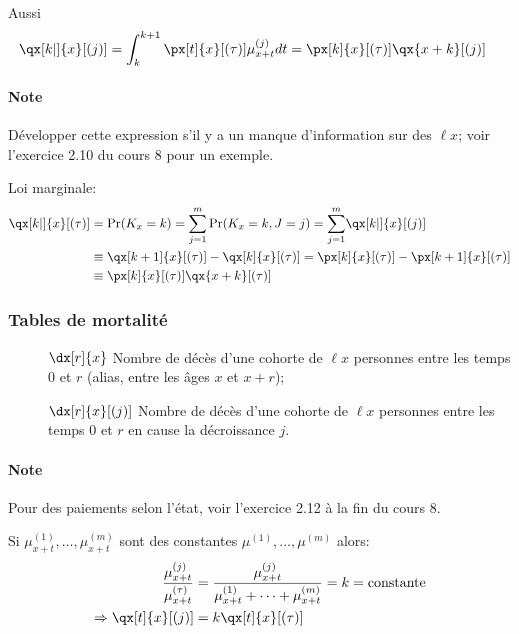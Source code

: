 \documentclass[10pt, french]{article}
\begin{document}
\begin{multicols*}{2}
Aussi
\begin{align*}
	\qx[k|]{x}[(j)]
	&=	\int_{k}^{k + 1} \px[t]{x}[(\tau)] \mu_{x + t}^{(j)}dt
	=	\px[k]{x}[(\tau)] \qx{x + k}[(j)]
\end{align*}
\paragraph{Note}	Développer cette expression s'il y a un manque d'information sur des $\ell{x}$; voir l'exercice 2.10 du cours 8 pour un exemple.

Loi marginale:
\begin{align*}
	\qx[k|]{x}[(\tau)]
	&=	\Pr(K_{x} = k)
	=	\sumz{m}{j = 1} \Pr(K_{x} = k, J = j)
	=	\sumz{m}{j = 1} \qx[k|]{x}[(j)]	\\
	&\equiv	\qx[k + 1]{x}[(\tau)] - \qx[k]{x}[(\tau)]
	=	\px[k]{x}[(\tau)] - \px[k + 1]{x}[(\tau)]	\\
	&\equiv \px[k]{x}[(\tau)] \qx{x + k}[(\tau)]
\end{align*}

\subsubsection*{Tables de mortalité}
\begin{description}
	\item[]	$\dx[r]{x}$	Nombre de décès d'une cohorte de $\ell{x}$ personnes entre les temps 0 et $r$ (alias, entre les âges $x$ et $x + r$);
	\item[]	$\dx[r]{x}[(j)]$	Nombre de décès d'une cohorte de $\ell{x}$ personnes entre les temps 0 et $r$ en cause la décroissance $j$.
\end{description}

\paragraph{Note}	Pour des paiements selon l'état, voir l'exercice 2.12 à la fin du cours 8. 

Si $\mu_{x + t}^{(1)}, \dots, \mu_{x + t}^{(m)}$ sont des constantes $\mu^{(1)}, \dots, \mu^{(m)}$ alors:
\begin{align*}
	\frac{\mu_{x + t}^{(j)}}{\mu_{x + t}^{(\tau)}}
	&=	\frac{\mu_{x + t}^{(j)}}{\mu_{x + t}^{(1)} + \dots + \mu_{x + t}^{(m)}}	
	=	k	
	=	\text{constante}	\\
	\Rightarrow	\qx[t]{x}[(j)]
	&=	k \qx[t]{x}[(\tau)]
\end{align*}

\columnbreak


\end{multicols*}
\end{document}
